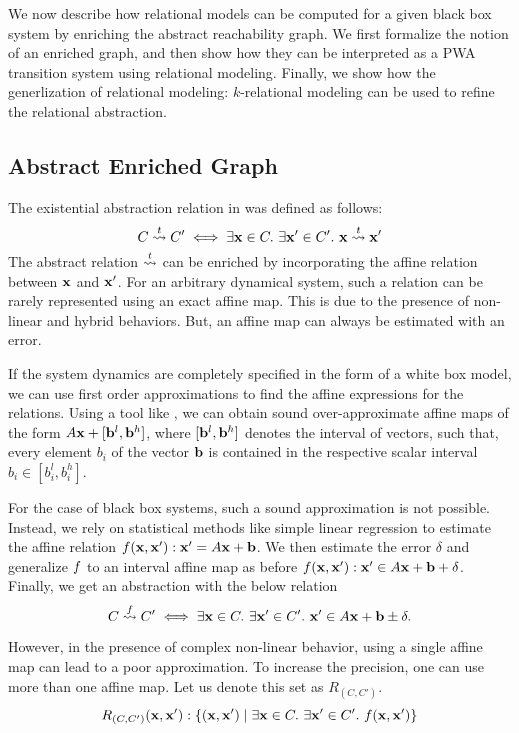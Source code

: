 
We now describe how relational models can be computed for a given
black box system by enriching the abstract reachability graph. We
first formalize the notion of an enriched graph, and then show how
they can be interpreted as a PWA transition system using relational
modeling. Finally, we show how the generlization of relational
modeling: $k$-relational modeling can be used to refine the relational
abstraction.

\subsection{Abstract Enriched Graph}

The existential abstraction relation in \cite{zutshi2014multiple} was defined as
follows:
\[
    C \overset{t}{\rightsquigarrow} C' \iff \exists \mathbf{x} \in C.\ \exists \mathbf{x}' \in C'.\ \mathbf{x} \overset{t}{\rightsquigarrow} \mathbf{x}'
\]
The abstract relation $\overset{t}{\rightsquigarrow}$ can be enriched by incorporating
the affine relation between $\mathbf{x}$ and $\mathbf{x}'$. For an arbitrary dynamical
system, such a relation can be rarely represented using an exact affine map.
This is due to the presence of non-linear and hybrid behaviors. But,
an affine map can always be estimated with an error.

If the system dynamics are completely specified in the form of a white
box model, we can use first order approximations to find the affine
expressions for the relations. Using a tool like \flowstar, we can
obtain sound over-approximate affine maps of the form $A\mathbf{x} + [\mathbf{b}^l,
\mathbf{b}^h]$, where $[\mathbf{b}^l,\mathbf{b}^h]$ denotes the interval of vectors, such
that, every element $b_i$ of the vector $\mathbf{b}$ is contained in the
respective scalar interval $b_i\in[b^l_i,b^h_i]$.

For the case of black box systems, such a sound approximation is not
possible. Instead, we rely on statistical methods like simple linear
regression to estimate the affine relation $f(\mathbf{x},\mathbf{x}'): \mathbf{x}'=A\mathbf{x} + \mathbf{b}$. We then
estimate the error $\delta$ and generalize $f$ to an interval
affine map as before $f(\mathbf{x},\mathbf{x}'): \mathbf{x}' \in A\mathbf{x} + \mathbf{b} + \delta$.  Finally, we get an
abstraction with the below relation
\[
    C \overset{f}{\rightsquigarrow} C' \iff \exists \mathbf{x} \in C.\ \exists \mathbf{x}' \in C'.\ \mathbf{x}' \in A\mathbf{x} + \mathbf{b} \pm \delta.
\]

However, in the presence of complex non-linear behavior, using a
single affine map can lead to a poor approximation. To increase the
precision, one can use more than one affine map. Let us denote this set as
$R_{(C,C')}$.%
\[
    R_{(C,C')}(\mathbf{x},\mathbf{x}'): \{(\mathbf{x},\mathbf{x}') \;|\; \exists \mathbf{x} \in C.\ \exists \mathbf{x}' \in C'.\ f(\mathbf{x},\mathbf{x}')\}
\]

